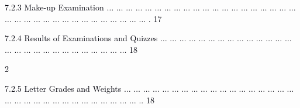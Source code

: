 \documentclass[12pt]{article}
\begin{document}
\vspace{\baselineskip}
\begin{adjustwidth}{0.5in}{0.0in}
{\fontsize{7pt}{8.4pt}\selectfont \textcolor[HTML]{00000A}{7.2.3 Make-up Examination $ \ldots $ $ \ldots $ $ \ldots $ $ \ldots $ $ \ldots $ $ \ldots $ $ \ldots $ $ \ldots $ $ \ldots $ $ \ldots $ $ \ldots $ $ \ldots $ $ \ldots $ $ \ldots $ $ \ldots $ $ \ldots $ $ \ldots $ $ \ldots $ $ \ldots $ $ \ldots $ $ \ldots $ $ \ldots $ $ \ldots $ $ \ldots $ $ \ldots $ $ \ldots $ $ \ldots $ $ \ldots $ $ \ldots $ $ \ldots $ $ \ldots $ $ \ldots $ $ \ldots $ $ \ldots $ $ \ldots $ . 17}\par}\par

\end{adjustwidth}


\vspace{\baselineskip}
\begin{adjustwidth}{0.5in}{0.0in}
{\fontsize{7pt}{8.4pt}\selectfont \textcolor[HTML]{00000A}{7.2.4 Results of Examinations and Quizzes $ \ldots $ $ \ldots $ $ \ldots $ $ \ldots $ $ \ldots $ $ \ldots $ $ \ldots $ $ \ldots $ $ \ldots $ $ \ldots $ $ \ldots $ $ \ldots $ $ \ldots $ $ \ldots $ $ \ldots $ $ \ldots $ $ \ldots $ $ \ldots $ $ \ldots $ $ \ldots $ $ \ldots $ $ \ldots $ $ \ldots $ $ \ldots $ $ \ldots $ $ \ldots $ $ \ldots $  18}\par}\par

\end{adjustwidth}


\vspace{\baselineskip}
\begin{adjustwidth}{0.0in}{-0.3in}
\begin{Center}
\textcolor[HTML]{00000A}{2}
\end{Center}\par

\end{adjustwidth}


\vspace{\baselineskip}
\begin{adjustwidth}{0.5in}{0.0in}
{\fontsize{7pt}{8.4pt}\selectfont \textcolor[HTML]{00000A}{7.2.5 Letter Grades and Weights $ \ldots $ $ \ldots $ $ \ldots $ $ \ldots $ $ \ldots $ $ \ldots $ $ \ldots $ $ \ldots $ $ \ldots $ $ \ldots $ $ \ldots $ $ \ldots $ $ \ldots $ $ \ldots $ $ \ldots $ $ \ldots $ $ \ldots $ $ \ldots $ $ \ldots $ $ \ldots $ $ \ldots $ $ \ldots $ $ \ldots $ $ \ldots $ $ \ldots $ $ \ldots $ $ \ldots $ $ \ldots $ $ \ldots $ $ \ldots $ $ \ldots $ $ \ldots $ .. 18}\par}\par

\end{adjustwidth}
\end{document}
